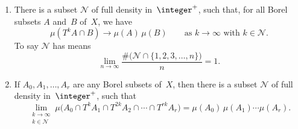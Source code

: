 \begin{thm}
\begin{enumerate}
	\item \label{WeakMixingZ-fulldensitySameset}
There is a subset $\mathcal{N}$ of full density in~$\integer^+$, such that, for all Borel subsets $A$ and~$B$ of~$X$, we have
	$$ \mu(T^k A \cap B) \longrightarrow \mu(A) \, \mu(B)  
	\qquad \text{as $k \to \infty$ with $k \in \mathcal{N}$}
	.$$
To say $\mathcal{N}$ has  means 
	$$ \lim_{n \to \infty} \frac{\# \bigl( \mathcal{N} \cap \{1,2,3,\ldots,n\} \bigr)}{n} = 1 .$$
		
	\item \label{WeakMixingZ-multi}
If $A_0,A_1,\dots,A_r$ are any Borel subsets of~$X$, then there is a subset $\mathcal{N}$ of full density in~$\integer^+$, such that
		$$ \lim_{\begin{smallmatrix}k \to \infty \\ k \in \mathcal{N}\end{smallmatrix}} 
			\mu \bigl(A_0 \cap T^kA_1 \cap T^{2k} A_2 \cap \cdots \cap T^{rk} A_r \bigr)
		= \mu(A_0) \, \mu(A_1) \cdots \mu(A_r)
		.$$

	\end{enumerate}
\end{thm}

